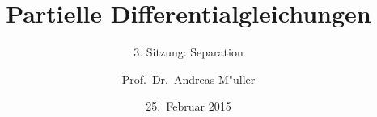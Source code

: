 \documentclass{beamer}
\title[]{Partielle Differentialgleichungen}
\subtitle{3. Sitzung: Separation}
\date[25.~Februar 2015]{25.~Februar 2015}
\author{Prof.~Dr.~Andreas M"uller}
\begin{document}
\begin{frame}
\titlepage
\end{frame}
\end{document}
